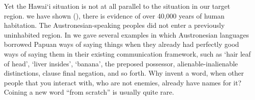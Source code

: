 Yet the Hawai‘i situation is not at all parallel to the situation
in our target region.
 we have shown (),
there is evidence of over 40,000 years of human habitation.
The Austronesian-speaking peoples did not enter a previously uninhabited region.
In  we gave several examples in which Austronesian
languages borrowed Papuan ways of saying things when they already
had perfectly good ways of saying them in their existing communication
framework, such as ‘hair {\tl} leaf of head’,
‘liver {\tl} insides’, ‘banana’,
the preposed possessor, alienable-inalienable distinctions,
clause final negation, and so forth.
Why invent a word,
when other people that you interact with,
who are not enemies,
already have names for it? Coining a new word “from scratch”
is usually quite rare.

